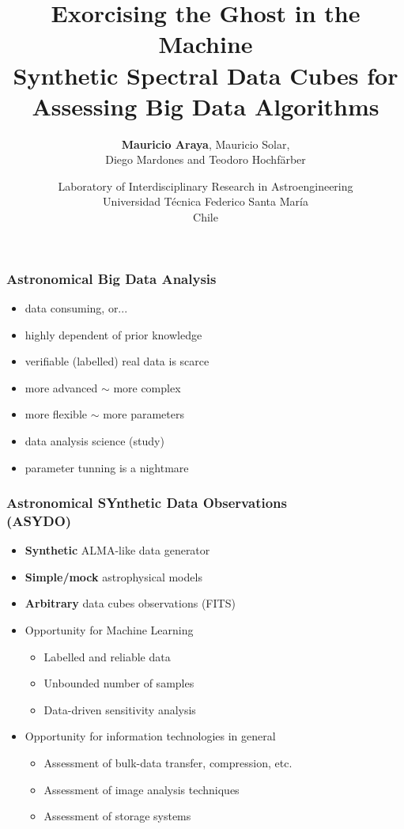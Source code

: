 \documentclass[slidestop,compress,mathserif,color,12pt]{beamer}
\title{Exorcising the Ghost in the Machine\\
\scriptsize Synthetic Spectral Data Cubes for Assessing Big Data Algorithms}
\author{\textbf{Mauricio Araya}, Mauricio Solar, \\Diego Mardones and
Teodoro Hochf\"arber}
\date{Laboratory of Interdisciplinary Research in Astroengineering\\ Universidad Técnica Federico Santa
María\\ Chile}
\begin{document}
\begin{frame}
  \titlepage
\end{frame}

\begin{frame}
  \frametitle{Astronomical Big Data Analysis}
\Large
\pause
{}

\pause


\pause

\normalsize 
\begin{itemize}
\item data consuming, or...
\item highly dependent of prior knowledge
\item verifiable (labelled) real data is scarce
\item more advanced $\sim$ more complex
\item more flexible $\sim$ more parameters
\item data analysis science (study)
\item parameter tunning is a nightmare 
\end{itemize}
\pause

\huge
{}
\end{frame}

\begin{frame}
  \frametitle{Astronomical SYnthetic Data Observations \\(ASYDO)}
\begin{itemize}
\item \textbf{Synthetic} ALMA-like data generator
\item \textbf{Simple/mock} astrophysical models
\item \textbf{Arbitrary} data cubes observations (FITS)
\item Opportunity for Machine Learning
\begin{itemize}
   \item Labelled and reliable data
   \item Unbounded number of samples
   \item Data-driven sensitivity analysis
\end{itemize}
\item Opportunity for information technologies in general
\begin{itemize}
   \item Assessment of bulk-data transfer, compression, etc.
   \item Assessment of image analysis techniques
   \item Assessment of storage systems
\end{itemize}
\end{itemize}
\end{frame}
\end{document}
